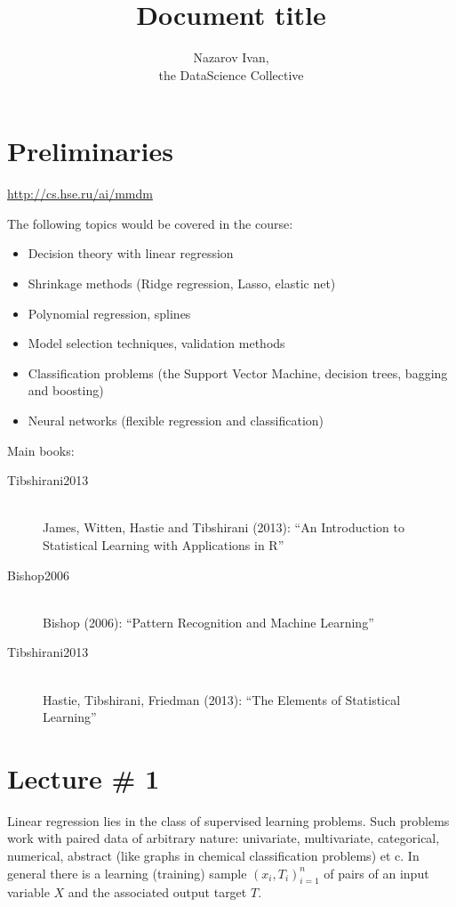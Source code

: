 \documentclass[a4paper]{article}
\title{Document title}
\author{Nazarov Ivan, \rus{101мНОД(ИССА)}\\the DataScience Collective}
\begin{document}
\maketitle

\section*{Preliminaries} %
\label{sec:preliminaries}

\url{http://cs.hse.ru/ai/mmdm}

The following topics would be covered in the course:
\begin{itemize}
	\item Decision theory with linear regression
	\item Shrinkage methods (Ridge regression, Lasso, elastic net)
	\item Polynomial regression, splines
	\item Model selection techniques, validation methods
	\item Classification problems (the Support Vector Machine, decision trees,
	bagging and boosting)
	\item Neural networks (flexible regression and classification)
\end{itemize}

Main books:
\begin{description}
	\item[Tibshirani2013] \hfill\\
		James, Witten, Hastie and Tibshirani (2013): ``An Introduction to Statistical Learning with Applications in R''
	\item[Bishop2006] \hfill\\
		Bishop (2006): ``Pattern Recognition and Machine Learning''
	\item[Tibshirani2013] \hfill\\
		Hastie, Tibshirani, Friedman (2013): ``The Elements of Statistical Learning''
\end{description}


\clearpage
\section{Lecture \# 1} %
\label{sec:lecture_1}

Linear regression lies in the class of supervised learning problems.
Such problems work with paired data of arbitrary nature: univariate, multivariate,
categorical, numerical, abstract (like graphs in chemical classification problems) et c.
In general there is a learning (training) sample $(x_i, T_i)_{i=1}^n$ of pairs
of an input variable $X$ and the associated output target $T$.
\end{document}

